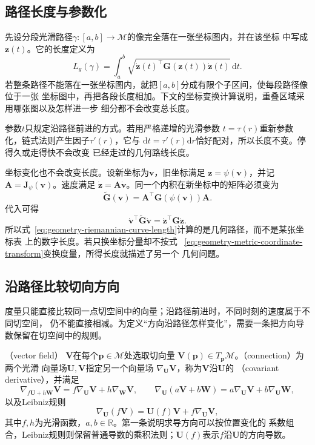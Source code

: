 \subsection{路径长度与参数化}

先设分段光滑路径$\gamma:[a,b]\to\mathcal{M}$的像完全落在一张坐标图内，并在该坐标
中写成$\bm{z}(t)$。它的长度定义为
\begin{equation}
  L_g(\gamma)
  =
  \int_a^b
  \sqrt{
    \dot{\bm{z}}(t)^{\top}
    \bm{G}(\bm{z}(t))
    \dot{\bm{z}}(t)
  }
  \,\mathrm{d}t.
  \label{eq:geometry-riemannian-curve-length}
\end{equation}
若整条路径不能落在一张坐标图内，就把$[a,b]$分成有限个子区间，使每段路径像位于一张
坐标图中，再把各段长度相加。下文的坐标变换计算说明，重叠区域采用哪张图以及怎样进一步
细分都不会改变总长度。

参数$t$只规定沿路径前进的方式。若用严格递增的光滑参数
$t=\tau(r)$重新参数化，链式法则产生因子$\tau'(r)$，它与
$\mathrm{d}t=\tau'(r)\mathrm{d}r$恰好配对，所以长度不变。停得久或走得快不会改变
已经走过的几何路线长度。

坐标变化也不会改变长度。设新坐标为$\bm{v}$，旧坐标满足
$\bm{z}=\psi(\bm{v})$，并记$\bm{A}=\bm{J}_{\psi}(\bm{v})$。速度满足
$\dot{\bm{z}}=\bm{A}\dot{\bm{v}}$。同一个内积在新坐标中的矩阵必须变为
\begin{equation}
  \widetilde{\bm{G}}(\bm{v})
  =
  \bm{A}^{\top}\bm{G}(\psi(\bm{v}))\bm{A}.
  \label{eq:geometry-metric-coordinate-transform}
\end{equation}
代入可得
\[
  \dot{\bm{v}}^{\top}\widetilde{\bm{G}}\dot{\bm{v}}
  =
  \dot{\bm{z}}^{\top}\bm{G}\dot{\bm{z}}.
\]
所以式~\eqref{eq:geometry-riemannian-curve-length}计算的是几何路径，而不是某张坐标表
上的数字长度。若只换坐标分量却不按式
~\eqref{eq:geometry-metric-coordinate-transform}变换度量，所得长度就描述了另一个
几何问题。

\subsection{沿路径比较切向方向}

度量只能直接比较同一点切空间中的向量；沿路径前进时，不同时刻的速度属于不同切空间，
仍不能直接相减。为定义“方向沿路径怎样变化”，需要一条把方向导数保留在切空间中的规则。

\begin{definition}[向量场与联络]
\label{def:geometry-connection}
（vector field）
$\bm{V}$在每个$\bm{p}\in\mathcal{M}$处选取切向量
$\bm{V}(\bm{p})\in T_{\bm{p}}\mathcal{M}$。（connection）为两个光滑
向量场$\bm{U},\bm{V}$指定另一个向量场
$\nabla_{\bm{U}}\bm{V}$，称为$\bm{V}$沿$\bm{U}$的
（covariant derivative），并满足
\[
  \nabla_{f\bm{U}+h\bm{W}}\bm{V}
  =
  f\nabla_{\bm{U}}\bm{V}
  +
  h\nabla_{\bm{W}}\bm{V},
  \qquad
  \nabla_{\bm{U}}(a\bm{V}+b\bm{W})
  =
  a\nabla_{\bm{U}}\bm{V}
  +
  b\nabla_{\bm{U}}\bm{W},
\]
以及Leibniz规则
\[
  \nabla_{\bm{U}}(f\bm{V})
  =
  \bm{U}(f)\bm{V}
  +
  f\nabla_{\bm{U}}\bm{V},
\]
其中$f,h$为光滑函数，$a,b\in\mathbb{R}$。第一条说明求导方向可以按位置变化的
系数组合，Leibniz规则则保留普通导数的乘积法则；$\bm U(f)$表示$f$沿$\bm U$的方向导数。
\end{definition}

